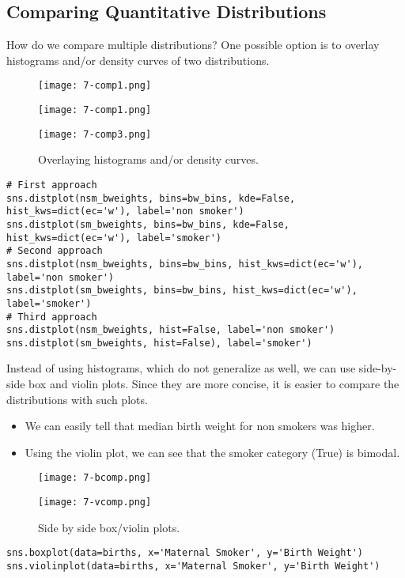 \subsection{Comparing Quantitative Distributions}
How do we compare multiple distributions? One possible option is to overlay histograms and/or density curves of two distributions.
\begin{figure}[ht]
\begin{minipage}{0.33\textwidth}
\centering
\texttt{[image: 7-comp1.png]}
\end{minipage}%
\begin{minipage}{0.33\textwidth}
\centering
\texttt{[image: 7-comp1.png]}
\end{minipage}%
\begin{minipage}{0.33\textwidth}
\centering
\texttt{[image: 7-comp3.png]}
\end{minipage}
\centering\caption{Overlaying histograms and/or density curves.}
\end{figure}
\begin{verbatim}
# First approach 
sns.distplot(nsm_bweights, bins=bw_bins, kde=False, hist_kws=dict(ec='w'), label='non smoker')
sns.distplot(sm_bweights, bins=bw_bins, kde=False, hist_kws=dict(ec='w'), label='smoker')
# Second approach
sns.distplot(nsm_bweights, bins=bw_bins, hist_kws=dict(ec='w'), label='non smoker')
sns.distplot(sm_bweights, bins=bw_bins, hist_kws=dict(ec='w'), label='smoker')
# Third approach
sns.distplot(nsm_bweights, hist=False, label='non smoker')
sns.distplot(sm_bweights, hist=False), label='smoker')
\end{verbatim}

Instead of using histograms, which do not generalize as well, we can use side-by-side box and violin plots. Since they are more concise, it is easier to compare the distributions with such plots.
\begin{itemize}
\item We can easily tell that median birth weight for non smokers was higher.
\item Using the violin plot, we can see that the smoker category (True) is bimodal.
\end{itemize}

\begin{figure}[ht]
\begin{minipage}{0.5\textwidth}
    \centering
\texttt{[image: 7-bcomp.png]}
\end{minipage}%
\begin{minipage}{0.5\textwidth}
    \centering
\texttt{[image: 7-vcomp.png]}
\end{minipage}
\centering
\caption{Side by side box/violin plots.}
\end{figure}
\begin{verbatim}
sns.boxplot(data=births, x='Maternal Smoker', y='Birth Weight')
sns.violinplot(data=births, x='Maternal Smoker', y='Birth Weight')
\end{verbatim}

